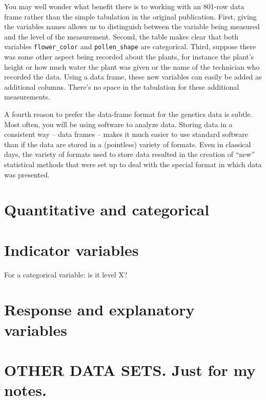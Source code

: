 \documentclass[]{tufte-book}
\begin{document}
You may well wonder what benefit there is to working with an 801-row data frame rather than the simple tabulation in the original publication. First, giving the variables names allows us to distinguish between the variable being measured and the level of the measurement. Second, the table makes clear that both variables \texttt{flower\_color} and \texttt{pollen\_shape} are categorical. Third, suppose there was some other aspect being recorded about the plants, for instance the plant's height or how much water the plant was given or the name of the technician who recorded the data. Using a data frame, these new variables can easily be added as additional columns. There's no space in the tabulation for these additional measurements.

A fourth reason to prefer the data-frame format for the genetics data is subtle. Most often, you will be using software to analyze data. Storing data in a consistent way -- data frames -- makes it much easier to use standard software than if the data are stored in a (pointless) variety of formats. Even in classical days, the variety of formats used to store data resulted in the creation of ``new'' statistical methods that were set up to deal with the special format in which data was presented.

\hypertarget{quantitative-and-categorical}{%
\section{Quantitative and categorical}\label{quantitative-and-categorical}}

\hypertarget{indicator-variables}{%
\section{Indicator variables}\label{indicator-variables}}

For a categorical variable: is it level X?

\hypertarget{response-and-explanatory-variables}{%
\section{Response and explanatory variables}\label{response-and-explanatory-variables}}

\hypertarget{other-data-sets.-just-for-my-notes.}{%
\section*{OTHER DATA SETS. Just for my notes.}\label{other-data-sets.-just-for-my-notes.}}
\end{document}
